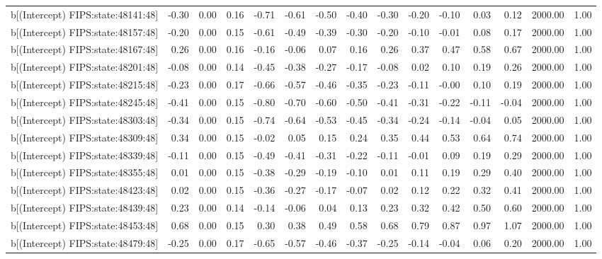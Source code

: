 \begin{table}[ht]
\begin{tabular}{rrrrrrrrrrrrrrr}
  b[(Intercept) FIPS:state:48141:48] & -0.30 & 0.00 & 0.16 & -0.71 & -0.61 & -0.50 & -0.40 & -0.30 & -0.20 & -0.10 & 0.03 & 0.12 & 2000.00 & 1.00 \\ 
  b[(Intercept) FIPS:state:48157:48] & -0.20 & 0.00 & 0.15 & -0.61 & -0.49 & -0.39 & -0.30 & -0.20 & -0.10 & -0.01 & 0.08 & 0.17 & 2000.00 & 1.00 \\ 
  b[(Intercept) FIPS:state:48167:48] & 0.26 & 0.00 & 0.16 & -0.16 & -0.06 & 0.07 & 0.16 & 0.26 & 0.37 & 0.47 & 0.58 & 0.67 & 2000.00 & 1.00 \\ 
  b[(Intercept) FIPS:state:48201:48] & -0.08 & 0.00 & 0.14 & -0.45 & -0.38 & -0.27 & -0.17 & -0.08 & 0.02 & 0.10 & 0.19 & 0.26 & 2000.00 & 1.00 \\ 
  b[(Intercept) FIPS:state:48215:48] & -0.23 & 0.00 & 0.17 & -0.66 & -0.57 & -0.46 & -0.35 & -0.23 & -0.11 & -0.00 & 0.10 & 0.19 & 2000.00 & 1.00 \\ 
  b[(Intercept) FIPS:state:48245:48] & -0.41 & 0.00 & 0.15 & -0.80 & -0.70 & -0.60 & -0.50 & -0.41 & -0.31 & -0.22 & -0.11 & -0.04 & 2000.00 & 1.00 \\ 
  b[(Intercept) FIPS:state:48303:48] & -0.34 & 0.00 & 0.15 & -0.74 & -0.64 & -0.53 & -0.45 & -0.34 & -0.24 & -0.14 & -0.04 & 0.05 & 2000.00 & 1.00 \\ 
  b[(Intercept) FIPS:state:48309:48] & 0.34 & 0.00 & 0.15 & -0.02 & 0.05 & 0.15 & 0.24 & 0.35 & 0.44 & 0.53 & 0.64 & 0.74 & 2000.00 & 1.00 \\ 
  b[(Intercept) FIPS:state:48339:48] & -0.11 & 0.00 & 0.15 & -0.49 & -0.41 & -0.31 & -0.22 & -0.11 & -0.01 & 0.09 & 0.19 & 0.29 & 2000.00 & 1.00 \\ 
  b[(Intercept) FIPS:state:48355:48] & 0.01 & 0.00 & 0.15 & -0.38 & -0.29 & -0.19 & -0.10 & 0.01 & 0.11 & 0.19 & 0.29 & 0.40 & 2000.00 & 1.00 \\ 
  b[(Intercept) FIPS:state:48423:48] & 0.02 & 0.00 & 0.15 & -0.36 & -0.27 & -0.17 & -0.07 & 0.02 & 0.12 & 0.22 & 0.32 & 0.41 & 2000.00 & 1.00 \\ 
  b[(Intercept) FIPS:state:48439:48] & 0.23 & 0.00 & 0.14 & -0.14 & -0.06 & 0.04 & 0.13 & 0.23 & 0.32 & 0.42 & 0.50 & 0.60 & 2000.00 & 1.00 \\ 
  b[(Intercept) FIPS:state:48453:48] & 0.68 & 0.00 & 0.15 & 0.30 & 0.38 & 0.49 & 0.58 & 0.68 & 0.79 & 0.87 & 0.97 & 1.07 & 2000.00 & 1.00 \\ 
  b[(Intercept) FIPS:state:48479:48] & -0.25 & 0.00 & 0.17 & -0.65 & -0.57 & -0.46 & -0.37 & -0.25 & -0.14 & -0.04 & 0.06 & 0.20 & 2000.00 & 1.00 \\ 

\end{tabular}
\end{table}
